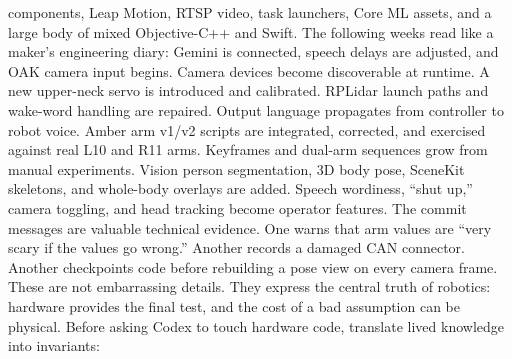 {}components, Leap Motion, RTSP video, task launchers, Core ML assets, and a large\markdownRendererSoftLineBreak
{}body of mixed Objective-C++ and Swift.\markdownRendererParagraphSeparator
{}The following weeks read like a maker's engineering diary:\markdownRendererInterblockSeparator
{}\markdownRendererUlBegin
\markdownRendererUlItem Gemini is connected, speech delays are adjusted, and OAK camera input begins.\markdownRendererUlItemEnd 
\markdownRendererUlItem Camera devices become discoverable at runtime.\markdownRendererUlItemEnd 
\markdownRendererUlItem A new upper-neck servo is introduced and calibrated.\markdownRendererUlItemEnd 
\markdownRendererUlItem RPLidar launch paths and wake-word handling are repaired.\markdownRendererUlItemEnd 
\markdownRendererUlItem Output language propagates from controller to robot voice.\markdownRendererUlItemEnd 
\markdownRendererUlItem Amber arm v1/v2 scripts are integrated, corrected, and exercised against real\markdownRendererSoftLineBreak
{}L10 and R11 arms.\markdownRendererUlItemEnd 
\markdownRendererUlItem Keyframes and dual-arm sequences grow from manual experiments.\markdownRendererUlItemEnd 
\markdownRendererUlItem Vision person segmentation, 3D body pose, SceneKit skeletons, and whole-body\markdownRendererSoftLineBreak
{}overlays are added.\markdownRendererUlItemEnd 
\markdownRendererUlItem Speech wordiness, “shut up,” camera toggling, and head tracking become\markdownRendererSoftLineBreak
{}operator features.\markdownRendererUlItemEnd 
\markdownRendererUlEnd \markdownRendererInterblockSeparator
{}The commit messages are valuable technical evidence. One warns that arm values\markdownRendererSoftLineBreak
{}are “very scary if the values go wrong.” Another records a damaged CAN\markdownRendererSoftLineBreak
{}connector. Another checkpoints code before rebuilding a pose view on every\markdownRendererSoftLineBreak
{}camera frame. These are not embarrassing details. They express the central\markdownRendererSoftLineBreak
{}truth of robotics: hardware provides the final test, and the cost of a bad\markdownRendererSoftLineBreak
{}assumption can be physical.\markdownRendererInterblockSeparator
{}\markdownRendererSectionBegin
{}\markdownRendererInterblockSeparator
{}Before asking Codex to touch hardware code, translate lived knowledge into\markdownRendererSoftLineBreak
{}invariants:\markdownRendererInterblockSeparator
{}\markdownRendererInterblockSeparator
